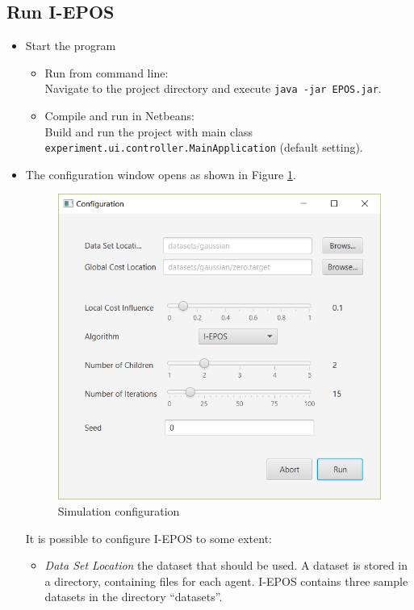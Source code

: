 \documentclass[11pt]{article} %
\newcommand{\code}{\texttt}
\begin{document}
\subsection{Run I-EPOS}
\begin{itemize}
	\item Start the program
	\begin{itemize}
	\item Run from command line:\\
Navigate to the project directory and execute \code{java -jar EPOS.jar}.
	\item Compile and run in Netbeans:\\
Build and run the project with main class \code{experiment.ui.controller.MainApplication} (default setting).
	\end{itemize}
	\item The configuration window opens as shown in Figure \ref{fig:config}.
\begin{figure}[h]
\centering
\includegraphics[scale=0.6]{img/configuration.png}
\caption{Simulation configuration}
\label{fig:config}
\end{figure}
	It is possible to configure I-EPOS to some extent:
	\begin{itemize}
		\item \emph{Data Set Location} the dataset that should be used. A dataset is stored in a directory, containing files for each agent. I-EPOS contains three sample datasets in the directory ``datasets''.

\end{itemize}
\end{itemize}
\end{document}
